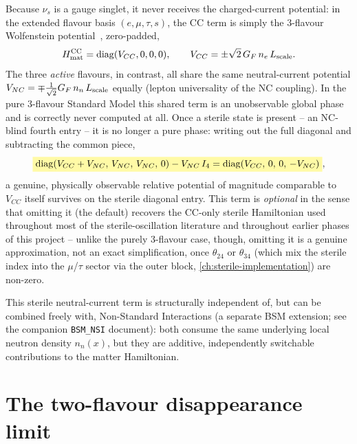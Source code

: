 \begin{theorybox}
Because $\nu_s$ is a gauge singlet, it never receives the charged-current
potential: in the extended flavour basis $(e,\mu,\tau,s)$, the CC term is
simply the 3-flavour Wolfenstein potential~\parencite{Wolfenstein1978},
zero-padded,
\begin{equation}
  H_{\rm mat}^{\rm CC} = \operatorname{diag}(V_{CC},0,0,0), \qquad V_{CC}=\pm\sqrt2\,G_F\,n_e\,L_{\rm scale}.
\end{equation}
The three \emph{active} flavours, in contrast, all share the same
neutral-current potential $V_{NC}=\mp\frac{1}{\sqrt2}G_F\,n_n\,L_{\rm scale}$
equally (lepton universality of the NC coupling). In the pure 3-flavour
Standard Model this shared term is an unobservable global phase and is
correctly never computed at all. Once a sterile state is present -- an
NC-blind fourth entry -- it is no longer a pure phase: writing out the full
diagonal and subtracting the common piece,
\begin{equation}
  \keyresult{
    \diag(V_{CC}+V_{NC},\,V_{NC},\,V_{NC},\,0) - V_{NC}\,I_4
    = \diag(V_{CC},\,0,\,0,\,-V_{NC})
  },
  \label{eq:sterile-nc}
\end{equation}
a genuine, physically observable relative potential of magnitude comparable
to $V_{CC}$ itself survives on the sterile diagonal entry. This term is
\emph{optional} in the sense that omitting it (the default) recovers the
CC-only sterile Hamiltonian used throughout most of the sterile-oscillation
literature and throughout earlier phases of this project -- unlike the
purely 3-flavour case, though, omitting it is a genuine approximation, not
an exact simplification, once $\theta_{24}$ or $\theta_{34}$ (which mix the
sterile index into the $\mu$/$\tau$ sector via the outer block,
\cref{ch:sterile-implementation}) are non-zero.
\end{theorybox}

\begin{notebox}
This sterile neutral-current term is structurally independent of, but can
be combined freely with, Non-Standard Interactions (a separate BSM
extension; see the companion \texttt{BSM\_NSI} document): both consume the
same underlying local neutron density $n_n(x)$, but they are additive,
independently switchable contributions to the matter Hamiltonian.
\end{notebox}

\section{The two-flavour disappearance limit}

